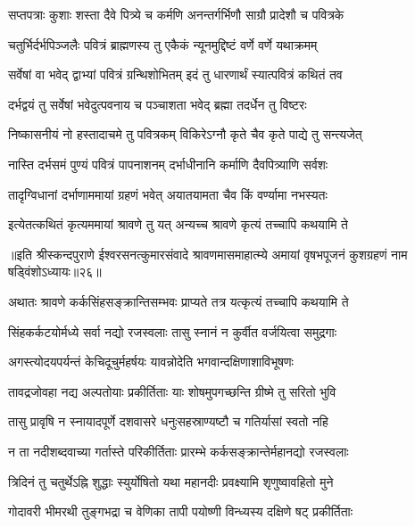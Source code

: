 \twolineshloka
{सप्तपत्राः कुशाः शस्ता दैवे पित्र्ये च कर्मणि}
{अनन्तर्गर्भिणौ साग्रौ प्रादेशौ च पवित्रके} %

\twolineshloka
{चतुर्भिर्दर्भपिञ्जलैः पवित्रं ब्राह्मणस्य तु}
{एकैकं न्यूनमुद्दिष्टं वर्णे वर्णे यथाक्रमम्} %

\twolineshloka
{सर्वेषां वा भवेद् द्वाभ्यां पवित्रं ग्रन्थिशोभितम्}
{इदं तु धारणार्थं स्यात्पवित्रं कथितं तव} %

\twolineshloka
{दर्भद्वयं तु सर्वेषां भवेदुत्पवनाय च}
{पञ्चाशता भवेद् ब्रह्मा तदर्धेन तु विष्टरः} %

\twolineshloka
{निष्कासनीयं नो हस्तादाचमे तु पवित्रकम्}
{विकिरेऽग्नौ कृते चैव कृते पाद्ये तु सन्त्यजेत्} %

\twolineshloka
{नास्ति दर्भसमं पुण्यं पवित्रं पापनाशनम्}
{दर्भाधीनानि कर्माणि दैवपित्र्याणि सर्वशः} %

\twolineshloka
{तादृग्विधानां दर्भाणाममायां ग्रहणं भवेत्}
{अयातयामता चैव किं वर्ण्यामा नभस्यतः} %

\twolineshloka
{इत्येतत्कथितं कृत्यममायां श्रावणे तु यत्}
{अन्यच्च श्रावणे कृत्यं तच्चापि कथयामि ते} %


{॥इति श्रीस्कन्दपुराणे ईश्वरसनत्कुमारसंवादे श्रावणमासमाहात्म्ये अमायां वृषभपूजनं कुशग्रहणं नाम षड्विंशोऽध्यायः॥२६॥}





\twolineshloka
{अथातः श्रावणे कर्कसिंहसङ्क्रान्तिसम्भवः}
{प्राप्यते तत्र यत्कृत्यं तच्चापि कथयामि ते} %

\twolineshloka
{सिंहकर्कटयोर्मध्ये सर्वा नद्यो रजस्वलाः}
{तासु स्नानं न कुर्वीत वर्जयित्वा समुद्रगाः} %

\twolineshloka
{अगस्त्योदयपर्यन्तं केचिदूचुर्महर्षयः}
{यावन्नोदेति भगवान्दक्षिणाशाविभूषणः} %

\twolineshloka
{तावद्रजोवहा नद्य अल्पतोयाः प्रकीर्तिताः}
{याः शोषमुपगच्छन्ति ग्रीष्मे तु सरितो भुवि} %

\twolineshloka
{तासु प्रावृषि न स्नायादपूर्णे दशवासरे}
{धनुःसहस्राण्यष्टौ च गतिर्यासां स्वतो नहि} %

\twolineshloka
{न ता नदीशब्दवाच्या गर्तास्ते परिकीर्तिताः}
{प्रारम्भे कर्कसङ्क्रान्तेर्महानद्यो रजस्वलाः} %

\twolineshloka
{त्रिदिनं तु चतुर्थेऽह्नि शुद्धाः स्युर्योषितो यथा}
{महानदीः प्रवक्ष्यामि शृणुष्वावहितो मुने} %

\twolineshloka
{गोदावरी भीमरथी तुङ्गभद्रा च वेणिका}
{तापी पयोष्णी विन्ध्यस्य दक्षिणे षट् प्रकीर्तिताः} %

